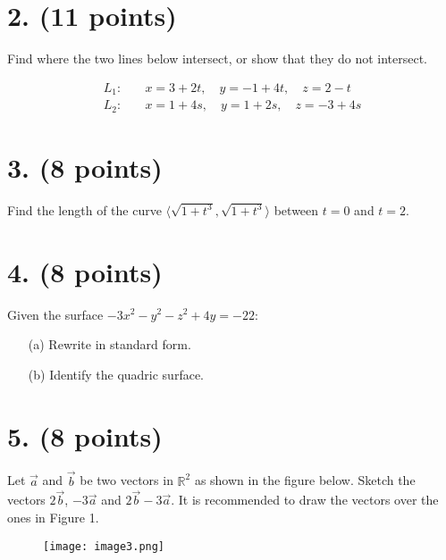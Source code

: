 \documentclass[12pt]{article}
\begin{document}
\newpage

\section*{2. (11 points)}

Find where the two lines below intersect, or show that they do not intersect.

\[
\begin{aligned}
L_1: & \quad x = 3 + 2t, \quad y = -1 + 4t, \quad z = 2 - t \\


L_2: & \quad x = 1 + 4s, \quad y = 1 + 2s, \quad z = -3 + 4s
\end{aligned}
\]

\newpage

\section*{3. (8 points)}

Find the length of the curve $\langle \sqrt{1 + t^3}, \sqrt{1 + t^3} \rangle$ between $t = 0$ and $t = 2$.

\section*{4. (8 points)}

Given the surface $-3x^2 - y^2 - z^2 + 4y = -22$:

\begin{itemize}
    \item[(a)] Rewrite in standard form.
    \item[(b)] Identify the quadric surface.
\end{itemize}

\newpage

\section*{5. (8 points)}

Let $\vec{a}$ and $\vec{b}$ be two vectors in $\mathbb{R}^2$ as shown in the figure below. Sketch the vectors $2\vec{b}$, $-3\vec{a}$ and $2\vec{b} - 3\vec{a}$. It is recommended to draw the vectors over the ones in Figure 1.

\begin{figure}[ht!]
        \centering
        \texttt{[image: image3.png]}
    \end{figure}

\newpage
\end{document}
